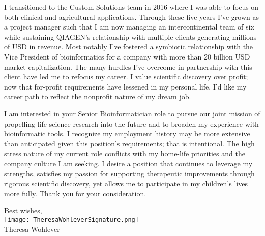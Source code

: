 \documentclass[10pt,letterpaper]{article}
\begin{document}
I transitioned to the Custom Solutions team in 2016 where I was able to focus on both clinical and agricultural applications. Through these five years I've grown as a project manager such that I am now managing an intercontinental team of six while sustaining QIAGEN's relationship with multiple clients generating millions of USD in revenue. Most notably I've fostered a symbiotic relationship with the Vice President of bioinformatics for a company with more than 20 billion USD market capitalization. The many hurdles I've overcome in partnership with this client have led me to refocus my career. I value scientific discovery over profit; now that for-profit requirements have lessened in my personal life, I'd like my career path to reflect the nonprofit nature of my dream job.


I am interested in your Senior Bioinformatician role to pursue our joint mission of propelling life science research into the future and to broaden my experience with bioinformatic tools. I recognize my employment history may be more extensive than anticipated given this position's requirements; that is intentional. The high stress nature of my current role conflicts with my home-life priorities and the company culture I am seeking. I desire a position that continues to leverage my strengths, satisfies my passion for supporting therapeutic improvements through rigorous scientific discovery, yet allows me to participate in my children’s lives more fully. Thank you for your consideration.




\hspace*{.6\linewidth} Best wishes, \\
\hspace*{.57\linewidth} \texttt{[image: TheresaWohleverSignature.png]}  {\vspace{-9pt}} \\
\hspace*{.6\linewidth}  Theresa Wohlever
\end{document}
